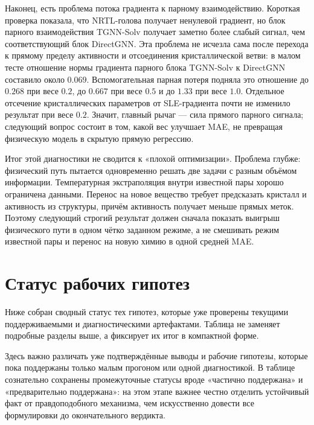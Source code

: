 \documentclass[11pt]{article}
\theoremstyle{definition}
\begin{document}
Наконец, есть проблема потока градиента к парному взаимодействию. Короткая проверка показала, что NRTL-голова получает ненулевой градиент, но блок парного взаимодействия TGNN-Solv получает заметно более слабый сигнал, чем соответствующий блок DirectGNN. Эта проблема не исчезла сама после перехода к прямому пределу активности и отсоединения кристаллической ветви: в малом тесте отношение нормы градиента парного блока TGNN-Solv к DirectGNN составило около $0.069$. Вспомогательная парная потеря подняла это отношение до $0.268$ при весе $0.2$, до $0.667$ при весе $0.5$ и до $1.33$ при весе $1.0$. Отдельное отсечение кристаллических параметров от SLE-градиента почти не изменило результат при весе $0.2$. Значит, главный рычаг --- сила прямого парного сигнала; следующий вопрос состоит в том, какой вес улучшает MAE, не превращая физическую модель в скрытую прямую регрессию.

Итог этой диагностики не сводится к «плохой оптимизации». Проблема глубже: физический путь пытается одновременно решать две задачи с разным объёмом информации. Температурная экстраполяция внутри известной пары хорошо ограничена данными. Перенос на новое вещество требует предсказать кристалл и активность из структуры, причём активность получает меньше прямых меток. Поэтому следующий строгий результат должен сначала показать выигрыш физического пути в одном чётко заданном режиме, а не смешивать режим известной пары и перенос на новую химию в одной средней MAE.

\section{Статус рабочих гипотез}

Ниже собран сводный статус тех гипотез, которые уже проверены текущими поддерживаемыми и диагностическими артефактами. Таблица не заменяет подробные разделы выше, а фиксирует их итог в компактной форме.

Здесь важно различать уже подтверждённые выводы и рабочие гипотезы, которые пока поддержаны только малым прогоном или одной диагностикой. В таблице сознательно сохранены промежуточные статусы вроде «частично поддержана» и «предварительно поддержана»: на этом этапе важнее честно отделить устойчивый факт от правдоподобного механизма, чем искусственно довести все формулировки до окончательного вердикта.
\end{document}
